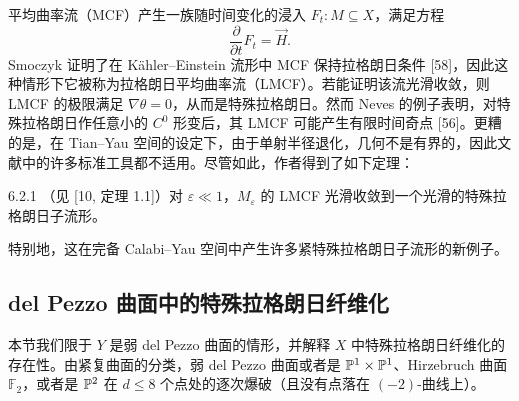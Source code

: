 平均曲率流（MCF）产生一族随时间变化的浸入 $F_t:M\subseteq X$，满足方程
\[
\frac{\partial}{\partial t}F_t=\vec H.
\]
Smoczyk 证明了在 Kähler--Einstein 流形中 MCF 保持拉格朗日条件 [58]，因此这种情形下它被称为拉格朗日平均曲率流（LMCF）。若能证明该流光滑收敛，则 LMCF 的极限满足 $\nabla\theta=0$，从而是特殊拉格朗日。然而 Neves 的例子表明，对特殊拉格朗日作任意小的 $C^0$ 形变后，其 LMCF 可能产生有限时间奇点 [56]。更糟的是，在 Tian--Yau 空间的设定下，由于单射半径退化，几何不是有界的，因此文献中的许多标准工具都不适用。尽管如此，作者得到了如下定理：

\begin{theorem}{6.2.1}
（见 [10, 定理 1.1]）对 $\varepsilon\ll 1$，$M_\varepsilon$ 的 LMCF 光滑收敛到一个光滑的特殊拉格朗日子流形。
\end{theorem}

特别地，这在完备 Calabi--Yau 空间中产生许多紧特殊拉格朗日子流形的新例子。

\subsection{del Pezzo 曲面中的特殊拉格朗日纤维化}
本节我们限于 $Y$ 是弱 del Pezzo 曲面的情形，并解释 $X$ 中特殊拉格朗日纤维化的存在性。由紧复曲面的分类，弱 del Pezzo 曲面或者是 $\mathbb{P}^1\times\mathbb{P}^1$、Hirzebruch 曲面 $\mathbb{F}_2$，或者是 $\mathbb{P}^2$ 在 $d\le 8$ 个点处的逐次爆破（且没有点落在 $(-2)$-曲线上）。


